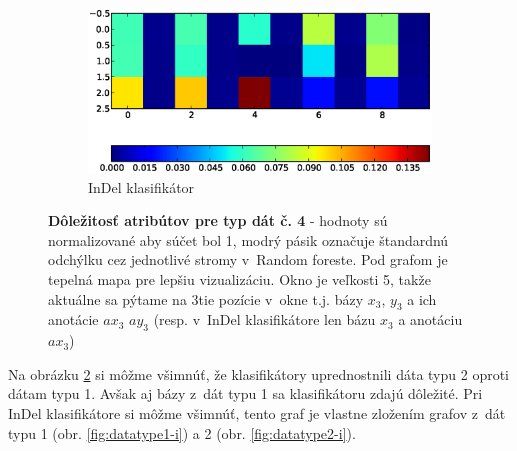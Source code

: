 \begin{figure}[htp]
\begin{subfigure}[t]{0.4\textwidth}
                \includegraphics[width=\textwidth]{images/clf_fi/randomforest_combined_5_indel_heatmap}
                \caption{InDel klasifikátor}
                \label{fig:datatype4-i}
        \end{subfigure}
        \caption[Dôležitosť atribútov pre typ dát č. 4]{
        \textbf{Dôležitosť atribútov pre typ dát č. 4} - hodnoty sú normalizované aby súčet bol 1, modrý pásik označuje štandardnú odchýlku cez jednotlivé stromy v~Random foreste.
        Pod grafom je tepelná mapa pre lepšiu vizualizáciu. Okno je veľkosti 5, takže aktuálne sa pýtame na 3tie pozície v~okne t.j. bázy $x_3$, $y_3$ a ich anotácie $ax_3$ $ay_3$ (resp. v~InDel klasifikátore len bázu $x_3$ a anotáciu $ax_3$)
        }
        \label{fig:datatype4}
\end{figure}


Na obrázku \ref{fig:datatype4} si môžme všimnúť, že klasifikátory uprednostnili dáta typu 2 oproti dátam typu 1.
Avšak aj bázy z~dát typu 1 sa klasifikátoru zdajú dôležité.
Pri InDel klasifikátore si môžme všimnúť, tento graf je vlastne zložením grafov z~dát typu 1 (obr. \ref{fig:datatype1-i}) a 2 (obr. \ref{fig:datatype2-i}).

